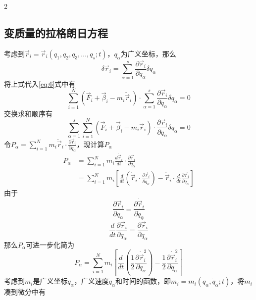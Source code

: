\documentclass[12pt,twoside]{article}
\numberwithin{equation}{section}    %
\begin{document}
\begin{multicols}{2}
    \subsection{变质量的拉格朗日方程}
    考虑到$\vec{r}_i=\vec{r}_i\left( q_1,q_2,q_3,...,q_s;t \right) $，$q_{\alpha}$为广义坐标，那么
    \[
    \delta \vec{r}_i=\sum_{\alpha =1}^s{\frac{\partial \vec{r}_i}{\partial q_{\alpha}}}\delta q_{\alpha}
    \]
    将上式代入\eqref{eq:6}式中有
    \[
    \sum_{i=1}^N{\left( \vec{F}_i+\vec{\beta}_i-m_i\ddot{\vec{r}}_i \right) \cdot}\sum_{\alpha =1}^s{\frac{\partial \vec{r}_i}{\partial q_{\alpha}}}\delta q_{\alpha}=0
    \]
    交换求和顺序有
    \begin{equation}
        \sum_{\alpha =1}^s{\sum_{i=1}^N{\left( \vec{F}_i+\vec{\beta}_i-m_i\ddot{\vec{r}}_i \right) \cdot}\frac{\partial \vec{r}_i}{\partial q_{\alpha}}\delta q_{\alpha}}=0
        \label{eq:7}
    \end{equation}
    令$P_{\alpha}=\sum_{i=1}^N{m_i\ddot{\vec{r}}_i\cdot \frac{\partial \vec{r}_i}{\partial q_{\alpha}}}$，现计算$P_{\alpha}$
    \[
    \begin{split}
        P_{\alpha} &= \sum_{i=1}^N m_i \frac{d\dot{\vec{r}}_i}{dt} \cdot \frac{\partial \vec{r}_i}{\partial q_{\alpha}} \\
               &= \sum_{i=1}^N m_i \left[ \frac{d}{dt} \left( \dot{\vec{r}}_i \cdot \frac{\partial \vec{r}_i}{\partial q_{\alpha}} \right) - \dot{\vec{r}}_i \cdot \frac{d}{dt} \frac{\partial \vec{r}_i}{\partial q_{\alpha}} \right]
    \end{split}
    \]
    由于
    \begin{equation}
        \frac{\partial \vec{r}_i}{\partial q_{\alpha}}=\frac{\partial \dot{\vec{r}}_i}{\partial \dot{q}_{\alpha}}
        \label{eq:8}
    \end{equation}
    \begin{equation}
        \frac{d}{dt}\frac{\partial \vec{r}_i}{\partial q_{\alpha}}=\frac{\partial \dot{\vec{r}}_i}{\partial q_{\alpha}}
        \label{eq:9}
    \end{equation}
    那么$P_{\alpha}$可进一步化简为
    \begin{equation}
        P_{\alpha}=\sum_{i=1}^N{m_i\left[ \frac{d}{dt}\left( \frac{1}{2}\frac{\partial \dot{\vec{r}}_{i}^{2}}{\partial \dot{q}_{\alpha}} \right) -\frac{1}{2}\frac{\partial \dot{\vec{r}}_{i}^{2}}{\partial q_{\alpha}} \right]}
        \label{eq:10}
    \end{equation}
    考虑到$m_i$是广义坐标$q_{\alpha}$，广义速度$\dot{q}_{\alpha}$和时间的函数，即$m_i=m_i\left( q_{\alpha},\dot{q}_{\alpha};t \right) $，将$m_i$凑到微分中有

\end{multicols}
\end{document}
